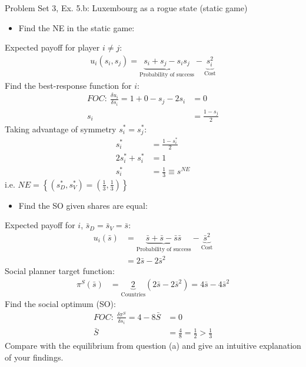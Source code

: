 \begin{frame}{Problem Set 3, Ex. 5.b: Luxembourg as a rogue state (static game)}
  \begin{multicols}{2}
    \begin{itemize}
      \item[(a)] Find the NE in the static game:
    \end{itemize}
    Expected payoff for player $i\neq j$:
    \begin{align*}
      u_i(s_i,s_j)=\underbrace{s_i+s_j-s_is_j}_\text{Probability of success}-\underbrace{s_i^2}_\text{Cost}
    \end{align*}
    Find the best-response function for $i$:
    \begin{align*}
      FOC:\ \frac{\delta u_i}{\delta s_i}=1+0-s_j-2s_i&=0\\
       s_i&=\frac{1-s_j}{2}
    \end{align*}
    Taking advantage of symmetry $s_i^{*}=s_j^{*}$:
    \begin{align*}
       s_i^{*}&=\frac{1-s_i^{*}}{2}\\
      2s_i^{*}+s_i^{*}&=1\\
       s_i^{*}&=\frac{1}{3}\equiv s^{NE}
    \end{align*}
    i.e. $NE=\left\{(s_D^{*},s_V^{*})=(\frac{1}{3},\frac{1}{3})\right\}$
  \vfill\null\columnbreak
    \begin{itemize}
      \item[(b)] Find the SO given shares are equal:
    \end{itemize}
    Expected payoff for $i$, $\bar{s}_D=\bar{s}_V=\bar{s}$:
    \begin{align*}
      u_i(\bar{s})&=\underbrace{\bar{s}+\bar{s}-\bar{s}\bar{s}}_\text{Probability of success}-\underbrace{\bar{s}^2}_\text{Cost}\\
                  &=2\bar{s}-2\bar{s}^2
    \end{align*}
    Social planner target function:
    \begin{align*}
      \pi^S(\bar{s})&=\underbrace{2}_\text{Countries}(2\bar{s}-2\bar{s}^2)=4\bar{s}-4\bar{s}^2
    \end{align*}
    Find the social optimum (SO):
    \begin{align*}
      FOC:\ \frac{\delta\pi^S}{\delta s_i}=4-8\bar{S}&=0\\
       \bar{S}&=\frac{4}{8}=\frac{1}{2}>\frac{1}{3}
    \end{align*}
    Compare with the equilibrium from question (a) and give an intuitive explanation of your findings.
  \vfill\null
  \end{multicols}
\end{frame}
